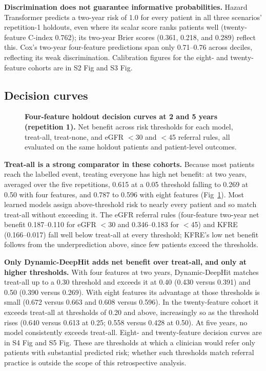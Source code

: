 \documentclass[10pt,letterpaper]{article}
\begin{document}
\textbf{Discrimination does not guarantee informative probabilities.} Hazard Transformer predicts a two-year risk of 1.0 for every patient in all three scenarios' repetition-1 holdouts, even where its scalar score ranks patients well (twenty-feature C-index 0.762); its two-year Brier scores (0.361, 0.218, and 0.289) reflect this. Cox's two-year four-feature predictions span only 0.71--0.76 across deciles, reflecting its weak discrimination. Calibration figures for the eight- and twenty-feature cohorts are in S2 Fig and S3 Fig.

\subsection*{Decision curves}

\begin{figure}[h!]
    \centering
    \caption{{\bf Four-feature holdout decision curves at 2 and 5 years (repetition 1).} Net benefit across risk thresholds for each model, treat-all, treat-none, and eGFR $<$30 and $<$45 referral rules, all evaluated on the same holdout patients and patient-level outcomes.}
    \label{fig:dca_four}
\end{figure}

\textbf{Treat-all is a strong comparator in these cohorts.} Because most patients reach the labelled event, treating everyone has high net benefit: at two years, averaged over the five repetitions, 0.615 at a 0.05 threshold falling to 0.269 at 0.50 with four features, and 0.787 to 0.596 with eight features (Fig~\ref{fig:dca_four}). Most learned models assign above-threshold risk to nearly every patient and so match treat-all without exceeding it. The eGFR referral rules (four-feature two-year net benefit 0.187--0.110 for eGFR $<$30 and 0.346--0.183 for $<$45) and KFRE (0.166--0.017) fall well below treat-all at every threshold; KFRE's low net benefit follows from the underprediction above, since few patients exceed the thresholds.

\textbf{Only Dynamic-DeepHit adds net benefit over treat-all, and only at higher thresholds.} With four features at two years, Dynamic-DeepHit matches treat-all up to a 0.30 threshold and exceeds it at 0.40 (0.430 versus 0.391) and 0.50 (0.390 versus 0.269). With eight features its advantage at those thresholds is small (0.672 versus 0.663 and 0.608 versus 0.596). In the twenty-feature cohort it exceeds treat-all at thresholds of 0.20 and above, increasingly so as the threshold rises (0.640 versus 0.613 at 0.25; 0.558 versus 0.428 at 0.50). At five years, no model consistently exceeds treat-all. Eight- and twenty-feature decision curves are in S4 Fig and S5 Fig. These are thresholds at which a clinician would refer only patients with substantial predicted risk; whether such thresholds match referral practice is outside the scope of this retrospective analysis.
\end{document}
